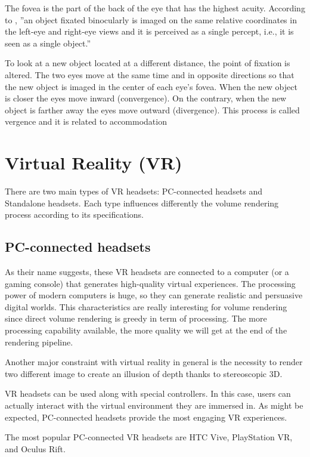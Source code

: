 The fovea is the part of the back of the eye that has the highest acuity. According to \cite{5743036}, ''an object fixated binocularly is imaged on the same relative coordinates in the left-eye and right-eye views and it is perceived as a single percept, i.e., it is seen as a single object.''



To look at a new object located at a different distance, the point of fixation is altered. The two eyes move at the same time and in opposite directions so that the new object is imaged in the center of each eye's fovea. When the new object is closer the eyes move inward (convergence). On the contrary, when the new object is farther away the eyes move outward (divergence). This process is called vergence and it is related to accommodation

\section{ Virtual Reality (VR)}

There are two main types of VR headsets: PC-connected headsets and Standalone headsets. Each type influences differently the volume rendering process according to its specifications.


\subsection{PC-connected headsets}

As their name suggests, these VR headsets are connected to a computer (or a gaming console) that generates high-quality virtual experiences. The processing power of modern computers is huge, so they can generate realistic and persuasive digital worlds. This characteristics are really interesting for volume rendering since direct volume rendering is greedy in term of processing. The more processing capability available, the more quality we will get at the end of the rendering pipeline. 

Another major constraint with virtual reality in general is the necessity to render two different image to create an illusion of depth thanks to stereoscopic 3D.


VR headsets can be used along with special controllers. In this case, users can actually interact with the virtual environment they are immersed in. As might be expected, PC-connected headsets provide the most engaging VR experiences.

The most popular PC-connected VR headsets are HTC Vive, PlayStation VR, and Oculus Rift.


